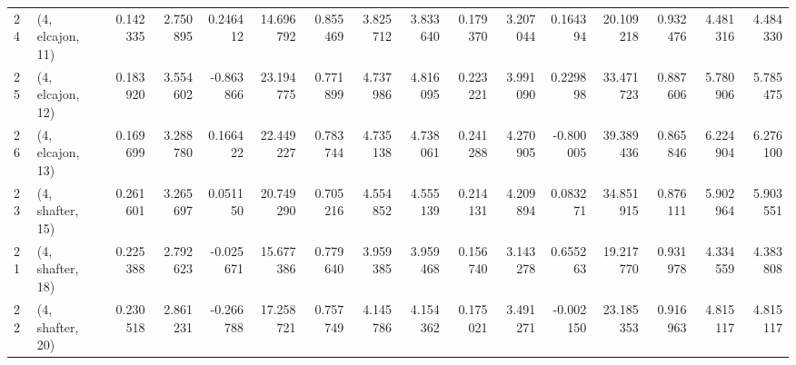 \begin{tabular}{llrrrrrrrrrrrrrr}
24 &  (4, elcajon, 11) &   0.142335 &  2.750895 &  0.246412 &  14.696792 &  0.855469 &   3.825712 &  3.833640 &  0.179370 &   3.207044 &  0.164394 &   20.109218 &  0.932476 &   4.481316 &   4.484330 \\
25 &  (4, elcajon, 12) &   0.183920 &  3.554602 & -0.863866 &  23.194775 &  0.771899 &   4.737986 &  4.816095 &  0.223221 &   3.991090 &  0.229898 &   33.471723 &  0.887606 &   5.780906 &   5.785475 \\
26 &  (4, elcajon, 13) &   0.169699 &  3.288780 &  0.166422 &  22.449227 &  0.783744 &   4.735138 &  4.738061 &  0.241288 &   4.270905 & -0.800005 &   39.389436 &  0.865846 &   6.224904 &   6.276100 \\
23 &  (4, shafter, 15) &   0.261601 &  3.265697 &  0.051150 &  20.749290 &  0.705216 &   4.554852 &  4.555139 &  0.214131 &   4.209894 &  0.083271 &   34.851915 &  0.876111 &   5.902964 &   5.903551 \\
21 &  (4, shafter, 18) &   0.225388 &  2.792623 & -0.025671 &  15.677386 &  0.779640 &   3.959385 &  3.959468 &  0.156740 &   3.143278 &  0.655263 &   19.217770 &  0.931978 &   4.334559 &   4.383808 \\
22 &  (4, shafter, 20) &   0.230518 &  2.861231 & -0.266788 &  17.258721 &  0.757749 &   4.145786 &  4.154362 &  0.175021 &   3.491271 & -0.002150 &   23.185353 &  0.916963 &   4.815117 &   4.815117 \\
\bottomrule
\end{tabular}
